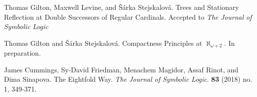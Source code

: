 \documentclass[bsl,meeting]{asl}
\begin{document}







\begin{thebibliography}{10}

Thomas Gilton, Maxwell Levine, and {\v S}{\'a}rka Stejskalov{\'a}. Trees and Stationary Reflection at Double Successors of Regular Cardinals. Accepted to {\it The Journal of Symbolic Logic} 

Thomas Gilton and {\v S}{\'a}rka Stejskalov{\'a}. Compactness Principles at $\aleph_{\omega+2}$. In preparation.

James Cummings, Sy-David Friedman, Menachem Magidor, Assaf Rinot,  and Dima Sinapova. The Eightfold Way. {\it The Journal of Symbolic Logic}. {\bf 83} (2018) no. 1, 349-371.




\end{thebibliography}


\vspace*{-0.5\baselineskip}
\end{document}
